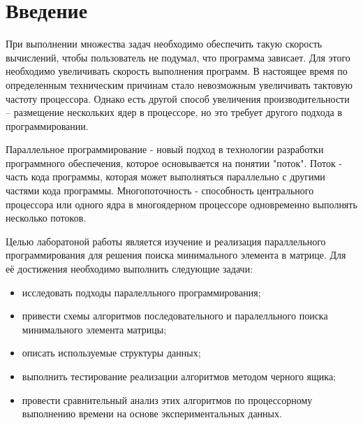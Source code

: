 \chapter*{Введение}
При выполнении множества задач необходимо обеспечить такую скорость вычислений, чтобы пользователь не подумал, что программа зависает. Для этого необходимо увеличивать скорость выполнения программ. В настоящее время по определенным техническим причинам стало невозможным увеличивать тактовую частоту процессора. Однако есть другой способ увеличения производительности – размещение нескольких ядер в процессоре, но это требует другого подхода в программировании.

Параллельное программирование - новый подход в технологии разработки программного обеспечения, которое основывается на понятии "поток". Поток - часть кода программы, которая может выполняться параллельно с другими частями кода программы. Многопоточность - способность центрального процессора или одного ядра в многоядерном процессоре одновременно выполнять несколько потоков.

Целью лаборатоной работы является изучение и реализация параллельного программирования для решения поиска минимального элемента в матрице. Для её достижения необходимо выполнить следующие задачи:
\begin{itemize}
	\item исследовать подходы паралелльного программирования;
	\item привести схемы алгоритмов последовательного и паралелльного поиска минимального элемента матрицы;
	\item описать используемые структуры данных;
	\item выполнить тестирование реализации алгоритмов методом черного ящика;
	\item провести сравнительный анализ этих алгоритмов по процессорному выполнению времени на основе экспериментальных данных.
\end{itemize}